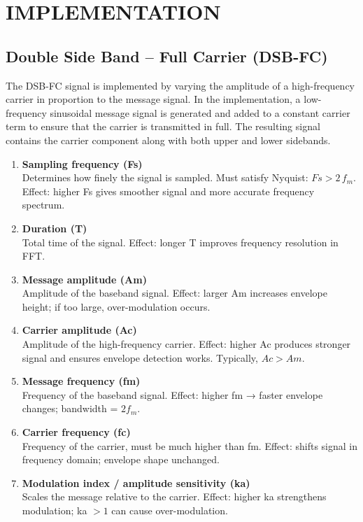 \newpage
\section*{IMPLEMENTATION}

\subsection*{Double Side Band -- Full Carrier (DSB-FC)}
{}
The DSB-FC signal is implemented by varying the amplitude of a high-frequency carrier in
proportion to the message signal. In the implementation, a low-frequency sinusoidal message
signal is generated and added to a constant carrier term to ensure that the carrier is
transmitted in full. The resulting signal contains the carrier component along with both
upper and lower sidebands.

\begin{enumerate}[itemsep=6pt, parsep=4pt, leftmargin=*, label={\textbf{\arabic*.}}]

\item \textbf{Sampling frequency (Fs)} \\
Determines how finely the signal is sampled. Must satisfy Nyquist: $Fs > 2 \, f_m$.  
Effect: higher Fs gives smoother signal and more accurate frequency spectrum.

\item \textbf{Duration (T)} \\
Total time of the signal.  
Effect: longer T improves frequency resolution in FFT.

\item\textbf{ Message amplitude (Am)} \\
Amplitude of the baseband signal.  
Effect: larger Am increases envelope height; if too large, over-modulation occurs.

\item \textbf{Carrier amplitude (Ac)} \\
Amplitude of the high-frequency carrier.  
Effect: higher Ac produces stronger signal and ensures envelope detection works. Typically, $Ac > Am$.

\item \textbf{Message frequency (fm)} \\
Frequency of the baseband signal.  
Effect: higher fm → faster envelope changes; bandwidth = $2 f_m$.

\item \textbf{Carrier frequency (fc)} \\
Frequency of the carrier, must be much higher than fm.  
Effect: shifts signal in frequency domain; envelope shape unchanged.

\item \textbf{Modulation index / amplitude sensitivity (ka)} \\
Scales the message relative to the carrier.  
Effect: higher ka strengthens modulation; ka $> 1$ can cause over-modulation.

\end{enumerate}

